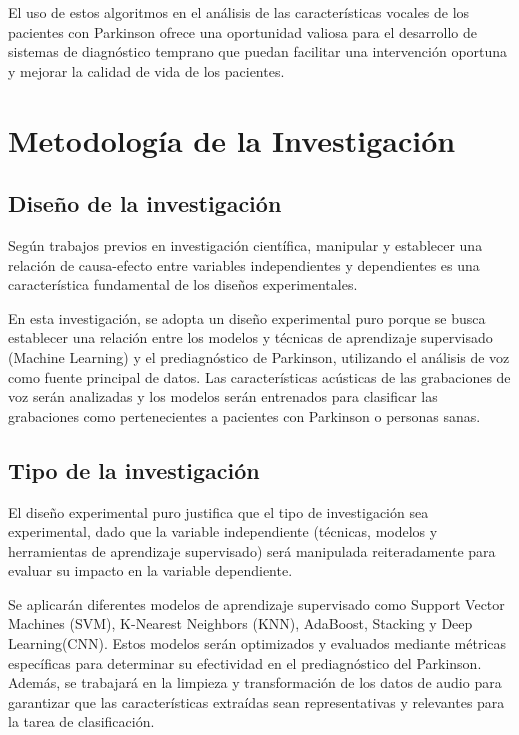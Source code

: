 \documentclass[listof=nochaptergap,12pt,times,authoryear]{report}
\begin{document}
El uso de estos algoritmos en el análisis de las características vocales de los pacientes con Parkinson ofrece una oportunidad valiosa para el desarrollo de sistemas de diagnóstico temprano que puedan facilitar una intervención oportuna y mejorar la calidad de vida de los pacientes.





\chapter{Metodología de la Investigación}

\section{ Diseño de la investigación}

Según trabajos previos en investigación científica, manipular y establecer una relación de causa-efecto entre variables independientes y dependientes es una característica fundamental de los diseños experimentales.

En esta investigación, se adopta un diseño experimental puro porque se busca establecer una relación entre los modelos y técnicas de aprendizaje supervisado (Machine Learning) y el prediagnóstico de Parkinson, utilizando el análisis de voz como fuente principal de datos. Las características acústicas de las grabaciones de voz serán analizadas y los modelos serán entrenados para clasificar las grabaciones como pertenecientes a pacientes con Parkinson o personas sanas.

\section{Tipo de la investigación}

El diseño experimental puro justifica que el tipo de investigación sea experimental, dado que la variable independiente (técnicas, modelos y herramientas de aprendizaje supervisado) será manipulada reiteradamente para evaluar su impacto en la variable dependiente.

Se aplicarán diferentes modelos de aprendizaje supervisado como Support Vector Machines (SVM), K-Nearest Neighbors (KNN), AdaBoost, Stacking y Deep Learning(CNN). Estos modelos serán optimizados y evaluados mediante métricas específicas para determinar su efectividad en el prediagnóstico del Parkinson. Además, se trabajará en la limpieza y transformación de los datos de audio para garantizar que las características extraídas sean representativas y relevantes para la tarea de clasificación.
\end{document}
